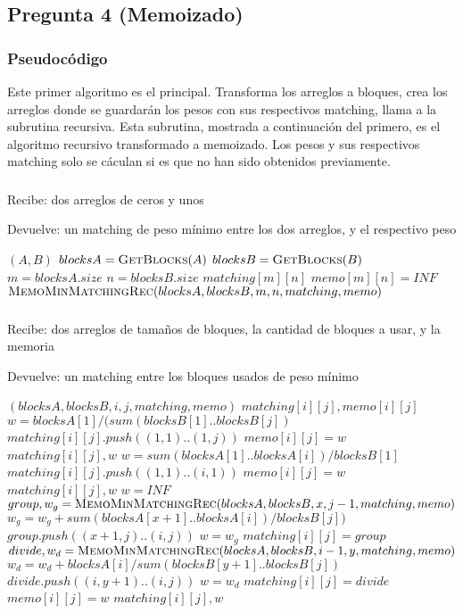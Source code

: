 \subsection*{Pregunta 4 (Memoizado)}
\subsubsection*{Pseudocódigo}
Este primer algoritmo es el principal. Transforma los arreglos a bloques, crea los arreglos donde se guardarán los pesos con sus respectivos matching, llama a la subrutina recursiva. Esta subrutina, mostrada a continuación del primero, es el algoritmo recursivo transformado a memoizado. Los pesos y sus respectivos matching solo se cáculan si es que no han sido obtenidos previamente.
\subsubsection*{}
Recibe: dos arreglos de ceros y unos

Devuelve: un matching de peso mínimo entre los dos arreglos, y el respectivo peso
\begin{algorithmic}[1]
  $(A,B)$
  \STATE $blocksA = \textsc{GetBlocks$(A)$}$
  \STATE $blocksB = \textsc{GetBlocks$(B)$}$
  \STATE $m = blocksA.size$
  \STATE $n = blocksB.size$
  \STATE $matching[m][n]$
  \STATE $memo[m][n] = INF$
  \RETURN $\textsc{MemoMinMatchingRec$(blocksA,blocksB,m,n,matching,memo)$}$
\end{algorithmic}
\subsubsection*{}
Recibe: dos arreglos de tamaños de bloques, la cantidad de bloques a usar, y la memoria

Devuelve: un matching entre los bloques usados de peso mínimo
\begin{algorithmic}[1]
  $(blocksA,blocksB,i,j,matching,memo)$
    \RETURN $matching[i][j],memo[i][j]$
  \ENDIF
    \STATE $w=blocksA[1]/(sum(blocksB[1]..blocksB[j])$
    \STATE $matching[i][j].push((1,1)..(1,j))$
    \STATE $memo[i][j] = w$
    \RETURN $matching[i][j],w$
  \ENDIF
    \STATE $w=sum(blocksA[1]..blocksA[i])/blocksB[1]$
    \STATE $matching[i][j].push((1,1)..(i,1))$
    \STATE $memo[i][j] = w$
    \RETURN $matching[i][j],w$
  \ENDIF
    \STATE $w = INF$
        \STATE $group,w_g=\textsc{MemoMinMatchingRec$(blocksA, blocksB, x,j-1,matching,memo)$}$
        \STATE $w_g = w_g +sum(blocksA[x+1]..blocksA[i])/blocksB[j])$
        \STATE $group.push((x+1,j)..(i,j))$
            \STATE $w = w_g$
            \STATE $matching[i][j] = group$
        \ENDIF
    \ENDFOR
        \STATE $divide,w_d=\textsc{MemoMinMatchingRec$(blocksA, blocksB, i-1, y,matching,memo)$}$
        \STATE $w_d = w_d + blocksA[i]/sum(blocksB[y+1]..blocksB[j])$
        \STATE $divide.push((i,y+1)..(i,j))$
            \STATE $w = w_d$
            \STATE $matching[i][j] = divide$
        \ENDIF
    \ENDFOR
    \STATE $memo[i][j] = w$
    \RETURN $matching[i][j],w$
\end{algorithmic}
